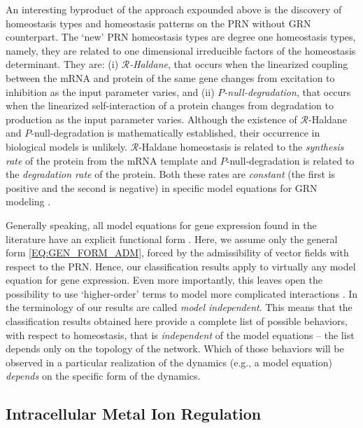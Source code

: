 \documentclass[a4paper,fleqn]{cas-dc}
\begin{document}
An interesting byproduct of the approach expounded above is the discovery of homeostasis types and homeostasis patterns on the PRN without GRN counterpart.
The `new' PRN homeostasis types are degree one homeostasis types, namely, they are related to one dimensional irreducible factors of the homeostasis determinant.
They are: (i) \emph{$\mathcal{R}$-Haldane}, that occurs when the linearized coupling between the mRNA and protein of the same gene changes from excitation to inhibition as the input parameter varies, and (ii) \emph{$P$-null-degradation}, that occurs when the linearized self-interaction of a protein changes from degradation to production as the input parameter varies.
Although the existence of $\mathcal{R}$-Haldane and $P$-null-degradation is mathematically established, their occurrence in biological models is unlikely.
$\mathcal{R}$-Haldane homeostasis is related to the \emph{synthesis rate} of the protein from the mRNA template and $P$-null-degradation is related to the \emph{degradation rate} of the protein.
Both these rates are {\em constant} (the first is positive and the second is negative) in specific model equations for GRN modeling \cite{phb2009,mszt2016}.

Generally speaking, all model equations for gene expression found in the literature have an explicit functional form \cite{antoneli2018,kebc2005,phb2009,mszt2016}. 
Here, we assume only the general form \ref{EQ:GEN_FORM_ADM}, forced by the admissibility of vector fields with respect to the PRN.
Hence, our classification results apply to virtually any model equation for gene expression.
Even more importantly, this leaves open the possibility to use `higher-order' terms to model more complicated interactions \cite{bghs2023}.
In the terminology of \cite{gs2023} our results are called \emph{model independent}.
This means that the classification results obtained here provide a complete list of possible behaviors, with respect to homeostasis, that is \emph{independent} of the model equations -- the list depends only on the topology of the network.
Which of those behaviors will be observed in a particular realization of the dynamics (e.g., a model equation) \emph{depends} on the specific form of the dynamics.


\subsection{Intracellular Metal Ion Regulation}
\label{SS:METAL}
\end{document}
